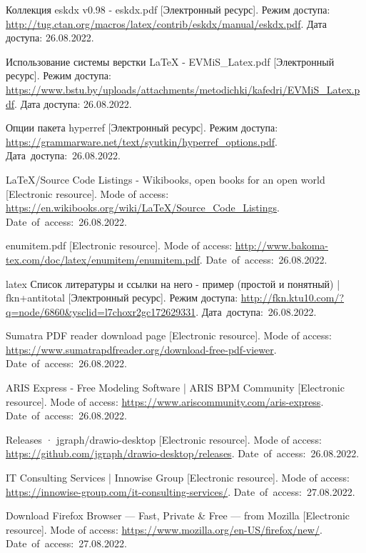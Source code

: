 \newpage
\begin{thebibliography}{}
  Коллекция eskdx v0.98 - eskdx.pdf
  [Электронный ресурс].
  Режим доступа: \url{http://tug.ctan.org/macros/latex/contrib/eskdx/manual/eskdx.pdf}.
  Дата доступа: 26.08.2022.

  Использование системы верстки LaTeX - EVMiS\_Latex.pdf
  [Электронный ресурс].
  Режим доступа: \url{https://www.bstu.by/uploads/attachments/metodichki/kafedri/EVMiS_Latex.pdf}.
  Дата доступа: 26.08.2022.

  Опции пакета hyperref
  [Электронный ресурс].
  Режим доступа: \url{https://grammarware.net/text/syutkin/hyperref_options.pdf}.
  Дата~доступа:~26.08.2022.

  LaTeX/Source Code Listings - Wikibooks, open books for an open world
  [Electronic resource].
  Mode of access: \url{https://en.wikibooks.org/wiki/LaTeX/Source_Code_Listings}.
  Date~of~access:~26.08.2022.

  enumitem.pdf
  [Electronic resource].
  Mode of access: \url{http://www.bakoma-tex.com/doc/latex/enumitem/enumitem.pdf}.
  Date~of~access:~26.08.2022.

  latex Список литературы и ссылки на него - пример (простой и понятный) | fkn+antitotal
  [Электронный ресурс].
  Режим доступа: \url{http://fkn.ktu10.com/?q=node/6860&ysclid=l7choxr2gc172629331}.
  Дата~доступа:~26.08.2022.

  Sumatra PDF reader download page
  [Electronic resource].
  Mode of access: \url{https://www.sumatrapdfreader.org/download-free-pdf-viewer}.
  Date~of~access:~26.08.2022.

  ARIS Express - Free Modeling Software | ARIS BPM Community
  [Electronic resource].
  Mode of access: \url{https://www.ariscommunity.com/aris-express}.
  Date~of~access:~26.08.2022.

  Releases · jgraph/drawio-desktop
  [Electronic resource].
  Mode of access: \url{https://github.com/jgraph/drawio-desktop/releases}.
  Date~of~access:~26.08.2022.

  IT Consulting Services | Innowise Group
  [Electronic resource].
  Mode of access: \url{https://innowise-group.com/it-consulting-services/}.
  Date~of~access:~27.08.2022.

  Download Firefox Browser — Fast, Private \& Free — from Mozilla
  [Electronic resource].
  Mode of access: \url{https://www.mozilla.org/en-US/firefox/new/}.
  Date~of~access:~27.08.2022.


\end{thebibliography}
